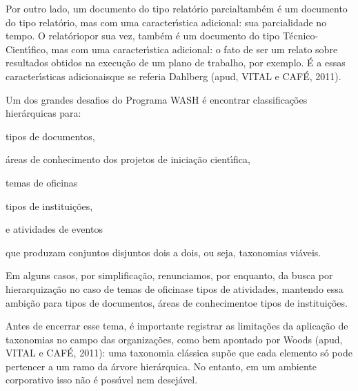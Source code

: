 \documentclass[
12pt,		%
openright,	%
twoside,  %
a4paper,			%
chapter=TITLE,		%
english,			%
french,				%
spanish,			%
brazil				%
]{USPSC-classe/USPSC}
\begin{document}
Por outro lado, um documento do tipo \textquotedbl relat\'orio parcial\textquotedbl  tamb\'em \'e um documento do tipo \textquotedbl relat\'orio\textquotedbl , mas com uma caracter\'{\i}stica adicional: sua parcialidade no tempo. O \textquotedbl relat\'orio\textquotedbl  por sua vez, tamb\'em \'e um documento do tipo \textquotedbl T\'ecnico-Cient\'{\i}fico\textquotedbl , mas com uma caracter\'{\i}stica adicional: o fato de ser um relato sobre resultados obtidos na execu\c{c}\~ao de um plano de trabalho, por exemplo. \'E a essas \textquotedbl caracter\'{\i}sticas adicionais\textquotedbl  que se referia Dahlberg  (apud, VITAL e CAF\'E, 2011).




Um dos grandes desafios do Programa WASH \'e encontrar classifica\c{c}\~oes hier\'arquicas para:





\begin{alineas}
\item \textquotedbl tipos de documentos\textquotedbl ,
\item \textquotedbl \'areas de conhecimento dos projetos de inicia\c{c}\~ao cient\'{\i}fica\textquotedbl ,
\item \textquotedbl temas de oficinas\textquotedbl 
\item \textquotedbl tipos de institui\c{c}\~oes\textquotedbl ,
\item e \textquotedbl atividades de eventos\textquotedbl 
\end{alineas}

que produzam conjuntos disjuntos dois a dois, ou seja, taxonomias vi\'aveis.




Em alguns casos, por simplifica\c{c}\~ao, renunciamos, por enquanto, da busca por hierarquiza\c{c}\~ao no caso de \textquotedbl temas de oficinas\textquotedbl  e \textquotedbl tipos de atividades\textquotedbl , mantendo essa ambi\c{c}\~ao para \textquotedbl tipos de documentos\textquotedbl , \textquotedbl \'areas de conhecimento\textquotedbl  e \textquotedbl tipos de institui\c{c}\~oes\textquotedbl .




Antes de encerrar esse tema, \'e importante registrar as limita\c{c}\~oes da aplica\c{c}\~ao de taxonomias no campo das organiza\c{c}\~oes, como bem apontado por Woods  (apud, VITAL e CAF\'E, 2011): \textquotedbl uma taxonomia cl\'assica sup\~oe que cada elemento s\'o pode pertencer a um ramo da \'arvore hier\'arquica. No entanto, em um ambiente corporativo isso n\~ao \'e poss\'{\i}vel nem desej\'avel\textquotedbl .
\end{document}
